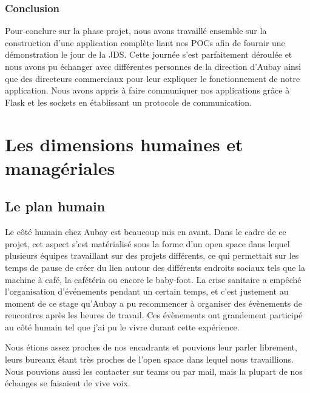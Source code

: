 \documentclass[11pt]{article}
\begin{document}
      \subsubsection{Conclusion}
        Pour conclure sur la phase projet, nous avons travaillé ensemble sur la construction d'une application complète liant nos POCs afin de
        fournir une démonstration le jour de la JDS. Cette journée s'est parfaitement déroulée et nous avons pu échanger avec différentes
        personnes de la direction d'Aubay ainsi que des directeurs commerciaux pour leur expliquer le fonctionnement de notre application.
        Nous avons appris à faire communiquer nos applications grâce à Flask et les sockets en établissant un protocole de communication.

  \pagebreak

  \section{Les dimensions humaines et managériales} 
    \subsection{Le plan humain}
      Le côté humain chez Aubay est beaucoup mis en avant. Dans le cadre de ce projet, cet aspect s'est 
      matérialisé sous la forme d'un open space dans lequel plusieurs équipes travaillant sur des projets 
      différents, ce qui permettait sur les temps de pause de créer du lien autour des différents endroits 
      sociaux tels que la machine à café, la cafétéria ou encore le baby-foot. La crise sanitaire a empêché
      l'organisation d'événements pendant un certain temps, et c'est justement au moment de ce stage qu'Aubay 
      a pu recommencer à organiser des évènements de rencontres après les heures de travail. Ces évènements 
      ont grandement participé au côté humain tel que j'ai pu le vivre durant cette expérience.

      Nous étions assez proches de nos encadrants et pouvions leur parler librement, leurs bureaux étant très 
      proches de l'open space dans lequel nous travaillions. Nous pouvions aussi les contacter sur teams ou 
      par mail, mais la plupart de nos échanges se faisaient de vive voix.
\end{document}
